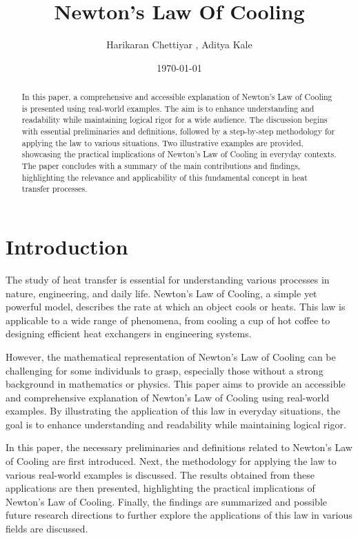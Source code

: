 \documentclass[12pt, a4paper]{article}
\title{Newton's Law Of Cooling}
\author{Harikaran Chettiyar , Aditya Kale}
\date{\today}
\begin{document}
\maketitle

\begin{abstract}
In this paper, a comprehensive and accessible explanation of Newton's Law of Cooling is presented using real-world examples. The aim is to enhance understanding and readability while maintaining logical rigor for a wide audience. The discussion begins with essential preliminaries and definitions, followed by a step-by-step methodology for applying the law to various situations. Two illustrative examples are provided, showcasing the practical implications of Newton's Law of Cooling in everyday contexts. The paper concludes with a summary of the main contributions and findings, highlighting the relevance and applicability of this fundamental concept in heat transfer processes.
\end{abstract}

\section{Introduction}
The study of heat transfer is essential for understanding various processes in nature, engineering, and daily life. Newton's Law of Cooling, a simple yet powerful model, describes the rate at which an object cools or heats. This law is applicable to a wide range of phenomena, from cooling a cup of hot coffee to designing efficient heat exchangers in engineering systems. 

\vspace{1em}

However, the mathematical representation of Newton's Law of Cooling can be challenging for some individuals to grasp, especially those without a strong background in mathematics or physics. This paper aims to provide an accessible and comprehensive explanation of Newton's Law of Cooling using real-world examples. By illustrating the application of this law in everyday situations, the goal is to enhance understanding and readability while maintaining logical rigor.

\vspace{1em}

In this paper, the necessary preliminaries and definitions related to Newton's Law of Cooling are first introduced. Next, the methodology for applying the law to various real-world examples is discussed. The results obtained from these applications are then presented, highlighting the practical implications of Newton's Law of Cooling. Finally, the findings are summarized and possible future research directions to further explore the applications of this law in various fields are discussed.
\end{document}
